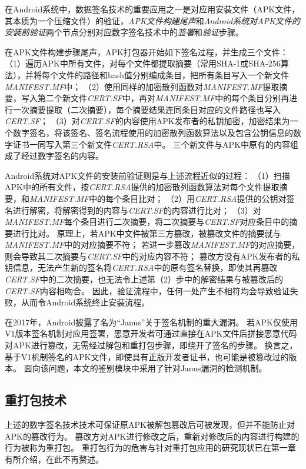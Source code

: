 在Android系统中，数据签名技术的重要应用之一是对应用安装文件（APK文件，其本质为一个压缩文件）的验证，\textit{APK文件构建尾声}和\textit{Android系统对APK文件的安装前验证}两个节点分别对应数字签名技术中的\textit{签署}和\textit{验证}步骤。

在APK文件构建步骤尾声，APK打包器开始如下签名过程，并生成三个文件：
（1）遍历APK中所有文件，对每个文件都提取摘要（常用SHA-1或SHA-256算法），并将每个文件的路径和hash值分别编成条目，把所有条目写入一个新文件\textit{MANIFEST.MF}中；
（2）使用同样的加密散列函数对\textit{MANIFEST.MF}提取摘要，写入第二个新文件\textit{CERT.SF}中，再对\textit{MANIFEST.MF}中的每个条目分别再进行一次摘要提取（二次摘要），每个摘要结果连同条目对应的文件路径也写入\textit{CERT.SF}；
（3）对\textit{CERT.SF}的内容使用APK发布者的私钥加密，加密结果为一个数字签名，将该签名、签名流程使用的加密散列函数算法以及包含公钥信息的数字证书一同写入第三个新文件\textit{CERT.RSA}中。
三个新文件与APK中原有的内容组成了经过数字签名的内容。

Android系统对APK文件的安装前验证则是与上述流程近似的过程：
（1）扫描APK中的所有文件，按\textit{CERT.RSA}提供的加密散列函数算法对每个文件提取摘要，和\textit{MANIFEST.MF}中的每个条目比对；
（2）用\textit{CERT.RSA}提供的公钥对签名进行解密，将解密得到的内容与\textit{CERT.SF}的内容进行比对；
（3）对\textit{MANIFEST.MF}每个条目进行二次摘要，将二次摘要与\textit{CERT.SF}对应条目中的摘要进行比对。
原理上，若APK中文件被第三方篡改，被篡改文件的摘要就与\textit{MANIFEST.MF}中的对应摘要不符；
若进一步篡改\textit{MANIFEST.MF}的对应摘要，则会导致其二次摘要与\textit{CERT.SF}中的对应内容不符；
篡改方没有APK发布者的私钥信息，无法产生新的签名将\textit{CERT.RSA}中的原有签名替换，即使其再篡改\textit{CERT.SF}中的二次摘要，也无法令上述第（2）步中的解密结果与被篡改后的\textit{CERT.SF}内容相吻合。
因此，验证流程中，任何一处产生不相符均会导致验证失败，从而令Android系统终止安装流程。

在2017年，Android披露了名为``Janus''关于签名机制的重大漏洞。
若APK仅使用V1版本签名机制对应用签署，恶意开发者可通过直接在APK文件后拼接恶意代码对APK进行篡改，无需经过解包和重打包步骤，即绕开了签名的步骤。
换言之，基于V1机制签名的APK文件，即使具有正版开发者证书，也可能是被篡改过的版本。
面向该问题，本文的鉴别模块中采用了针对Janus漏洞的检测机制。

\subsection{重打包技术}
\label{sec:repackaging}

上述的数字签名技术技术可保证原APK被解包篡改后可被发现，但并不能防止对APK的篡改行为。
篡改方对APK进行修改之后，重新对修改后的内容进行构建的行为被称为重打包。
重打包行为的危害与针对重打包应用的研究现状已在第一章有所介绍，在此不再赘述。

